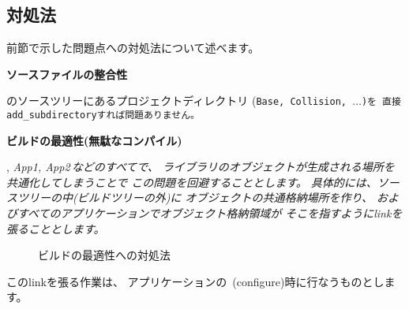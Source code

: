 \subsection{対処法}
\label{subsec:Solution}

\noindent
前節で示した問題点への対処法について述べます。

\bigskip
\noindent
\bf{ソースファイルの整合性}
\begin{narrow}[20pt]
	\SprLib のソースツリーにあるプロジェクトディレクトリ
	(\tt{Base}, \tt{Collision}, $\ldots$)を
	直接\tt{add\_subdirectory}すれば問題ありません。
\end{narrow}

\medskip
\noindent
\bf{ビルドの最適性(無駄なコンパイル)}
\begin{narrow}[20pt]
	\SprLib, \it{App1, App2\,}などのすべてで、
	ライブラリのオブジェクトが生成される場所を共通化してしまうことで
	この問題を回避することとします。
	具体的には、\SprLib ソースツリーの中(ビルドツリーの外)に
	オブジェクトの共通格納場所を作り、
	\SprLib およびすべてのアプリケーションでオブジェクト格納領域が
	そこを指すようにlinkを張ることとします。

	\begin{figure}[h]
    	\begin{narrow}[40pt]\begin{minipage}{\textwidth}
		{\footnotesize{}}
		\medskip
    	\end{minipage}\end{narrow}
    	\begin{narrow}[40pt]\begin{minipage}{\textwidth}
		{\footnotesize{}}
		\medskip
  	\end{minipage}\end{narrow}
	\caption{ビルドの最適性への対処法}
	\label{fig:SolutionToBuildOptimization}
	\end{figure}
	\indent
	このlinkを張る作業は、
	アプリケーションの\cmake\ (configure)時に行なうものとします。
\end{narrow}

